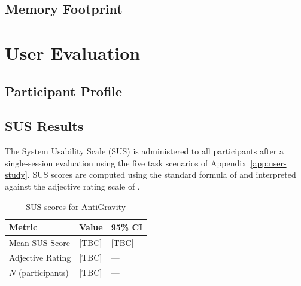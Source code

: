 \subsection{Memory Footprint}


\section{User Evaluation}
\label{sec:eval-user}

\subsection{Participant Profile}


\subsection{SUS Results}

The System Usability Scale (SUS) is administered to all participants after a single-session evaluation using the five task scenarios of Appendix~\ref{app:user-study}. SUS scores are computed using the standard formula of \citet{Brooke1996SUS} and interpreted against the adjective rating scale of \citet{Bangor2009SUSAdjective}.

\begin{table}[H]
\centering
\caption{SUS scores for AntiGravity}
\label{tab:sus-results}
\begin{tabularx}{\textwidth}{@{}lXX@{}}
\toprule
\textbf{Metric} & \textbf{Value} & \textbf{95\% CI} \\
\midrule
Mean SUS Score & [TBC] & [TBC] \\
Adjective Rating & [TBC] & --- \\
$N$ (participants) & [TBC] & --- \\
\bottomrule
\end{tabularx}
\end{table}

